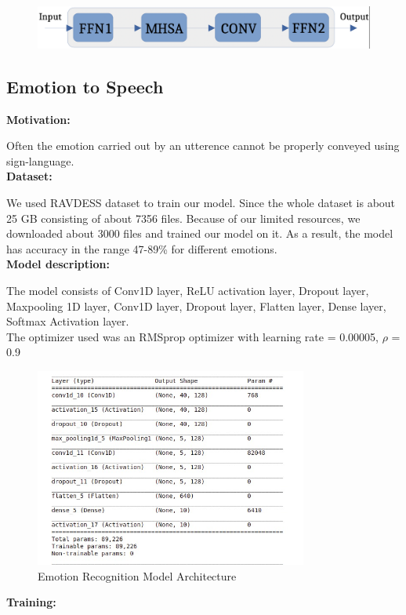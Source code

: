 \documentclass[14pt,a4paper]{article}
\begin{document}
\begin{figure}
    \includegraphics[width=\textwidth]{../images/espnet_pipeline.png}
\end{figure}

\newpage

\subsection{Emotion to Speech}
\textbf{Motivation:}

Often the emotion carried out by an utterence cannot be properly conveyed using sign-language.\\
\textbf{Dataset:}

We used RAVDESS \cite{ravdess} dataset to train our model. Since the whole dataset is about 25 GB consisting of about 7356 files. Because of our limited resources, we downloaded about 3000 files and trained our model on it. As a result, the model has accuracy in the range 47-89\% for different emotions.\\
\textbf{Model description:}

The model consists of Conv1D layer, ReLU activation layer,  Dropout layer, Maxpooling 1D layer, Conv1D layer, Dropout layer, Flatten layer, Dense layer, Softmax Activation layer.\\
The optimizer used was an RMSprop optimizer with learning rate = 0.00005, $\rho$ = 0.9
\begin{figure}
\centering
\includegraphics[width=0.8\textwidth]{../images/emo_rec_model.jpeg}
\caption{Emotion Recognition Model Architecture}
\end{figure}
\textbf{Training:}
\end{document}
